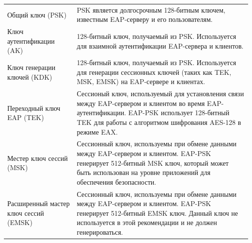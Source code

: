 \begin{longtable}[\textwidth]{p{}p{}}
 Общий ключ (PSK) & PSK является долгосрочным 128-битным ключем, известным EAP-серверу и его пользователям. \\
 Ключ аутентификации (AK) & 128-битный ключ, получаемый из PSK. Используется для взаимной аутентификации EAP-сервера и клиентов. \\
 Ключ генерации ключей (KDK) & 128-битный ключ, получаемый из PSK. Используется для генерации сессионных ключей (таких как TEK, MSK, EMSK) на EAP-сервере и клиентах. \\
 Переходный ключ EAP (TEK) & Сессионый ключ, используемый для установления связи между EAP-сервером и клиентом во время EAP-аутентификации. EAP-PSK использует 128-битный TEK для работы с алгоритмом шифрования AES-128 в режиме EAX. \\
 Местер ключ сессий (MSK) & Сессионный ключ, используемы при обмене данными между EAP-сервером и клиентом. EAP-PSK генерирует 512-битный MSK ключ, который может быть использован на уровне приложений для обеспечения безопасности. \\
 Расширенный мастер ключ сессий (EMSK) & Сессионный ключ, используемы при обмене данными между EAP-сервером и клиентом. EAP-PSK генерирует 512-битный EMSK ключ. Данный ключ не используется в этой рекомендации и не должен генерироваться. \\
\end{longtable}

